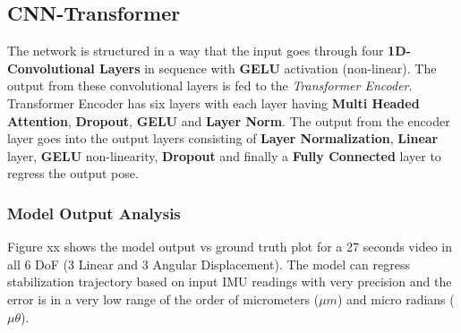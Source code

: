 \subsection{CNN-Transformer}
The network is structured in a way that the input goes through four \textbf{1D-Convolutional Layers} in sequence with \textbf{GELU} activation (non-linear). The output from these convolutional layers is fed to the \textit{Transformer Encoder}. Transformer Encoder has six layers with each layer having \textbf{Multi Headed Attention}, \textbf{Dropout}, \textbf{GELU} and \textbf{Layer Norm}. The output from the encoder layer goes into the output layers consisting of \textbf{Layer Normalization}, \textbf{Linear} layer, \textbf{GELU} non-linearity, \textbf{Dropout} and finally a \textbf{Fully Connected} layer to regress the output pose.

\subsubsection{Model Output Analysis}
Figure xx shows the model output vs ground truth plot for a 27 seconds video in all 6 DoF (3 Linear and 3 Angular Displacement). The model can regress stabilization trajectory based on input IMU readings with very precision and the error is in a very low range of the order of micrometers ($ \mu m $) and micro radians ($ \mu \theta $).

